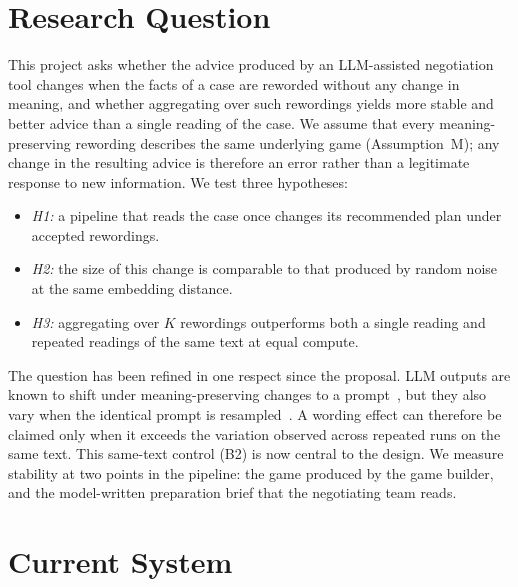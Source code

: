 \documentclass[10pt,twocolumn,letterpaper]{article}
\begin{document}

\section{Research Question}

This project asks whether the advice produced by an LLM-assisted negotiation tool changes when the facts of a case are reworded without any change in meaning, and whether aggregating over such rewordings yields more stable and better advice than a single reading of the case. We assume that every meaning-preserving rewording describes the same underlying game (Assumption~M); any change in the resulting advice is therefore an error rather than a legitimate response to new information. We test three hypotheses:
\begin{itemize}
\item \textit{H1:} a pipeline that reads the case once changes its recommended plan under accepted rewordings.
\item \textit{H2:} the size of this change is comparable to that produced by random noise at the same embedding distance.
\item \textit{H3:} aggregating over $K$ rewordings outperforms both a single reading and repeated readings of the same text at equal compute.
\end{itemize}

The question has been refined in one respect since the proposal. LLM outputs are known to shift under meaning-preserving changes to a prompt~\cite{sclar}, but they also vary when the identical prompt is resampled~\cite{selfconsistency}. A wording effect can therefore be claimed only when it exceeds the variation observed across repeated runs on the same text. This same-text control (B2) is now central to the design. We measure stability at two points in the pipeline: the game produced by the game builder, and the model-written preparation brief that the negotiating team reads.

\section{Current System}
\end{document}

